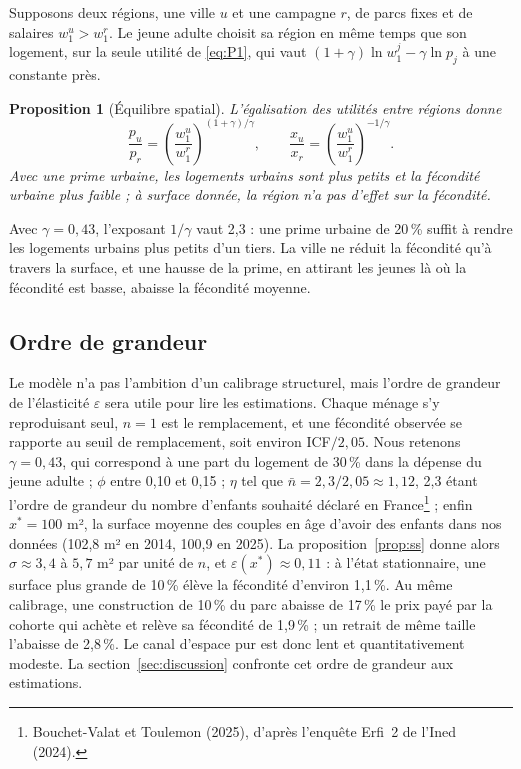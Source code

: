 \documentclass[11pt,a4paper]{article}
\theoremstyle{plain}
\newtheorem{proposition}{Proposition}
\theoremstyle{definition}
\theoremstyle{remark}
\newcommand{\eps}{\varepsilon}
\begin{document}
Supposons deux régions, une ville $u$ et une campagne $r$, de parcs fixes et de salaires $w_1^u > w_1^r$. Le jeune adulte choisit sa région en même temps que son logement, sur la seule utilité de \eqref{eq:P1}, qui vaut $(1+\gamma)\ln w_1^j - \gamma\ln p_j$ à une constante près.

\begin{proposition}[Équilibre spatial]\label{prop:regions}
L'égalisation des utilités entre régions donne
\[
\frac{p_u}{p_r} = \left(\frac{w_1^u}{w_1^r}\right)^{(1+\gamma)/\gamma}, \qquad
\frac{x_u}{x_r} = \left(\frac{w_1^u}{w_1^r}\right)^{-1/\gamma}.
\]
Avec une prime urbaine, les logements urbains sont plus petits et la fécondité urbaine plus faible ; à surface donnée, la région n'a pas d'effet sur la fécondité.
\end{proposition}

Avec $\gamma = 0{,}43$, l'exposant $1/\gamma$ vaut 2,3 : une prime urbaine de 20\,\% suffit à rendre les logements urbains plus petits d'un tiers. La ville ne réduit la fécondité qu'à travers la surface, et une hausse de la prime, en attirant les jeunes là où la fécondité est basse, abaisse la fécondité moyenne.

\subsection{Ordre de grandeur}\label{sec:calibrage}

Le modèle n'a pas l'ambition d'un calibrage structurel, mais l'ordre de grandeur de l'élasticité $\eps$ sera utile pour lire les estimations. Chaque ménage s'y reproduisant seul, $n = 1$ est le remplacement, et une fécondité observée se rapporte au seuil de remplacement, soit environ ICF$/2{,}05$. Nous retenons $\gamma = 0{,}43$, qui correspond à une part du logement de 30\,\% dans la dépense du jeune adulte ; $\phi$ entre 0,10 et 0,15 ; $\eta$ tel que $\bar n = 2{,}3/2{,}05 \approx 1{,}12$, 2,3 étant l'ordre de grandeur du nombre d'enfants souhaité déclaré en France\footnote{Bouchet-Valat et Toulemon (2025), d'après l'enquête Erfi~2 de l'Ined (2024).} ; enfin $x^* = 100$ m², la surface moyenne des couples en âge d'avoir des enfants dans nos données (102,8 m² en 2014, 100,9 en 2025). La proposition~\ref{prop:ss} donne alors $\sigma \approx 3{,}4$ à $5{,}7$ m² par unité de $n$, et $\eps(x^*) \approx 0{,}11$ : à l'état stationnaire, une surface plus grande de 10\,\% élève la fécondité d'environ 1,1\,\%. Au même calibrage, une construction de 10\,\% du parc abaisse de 17\,\% le prix payé par la cohorte qui achète et relève sa fécondité de 1,9\,\% ; un retrait de même taille l'abaisse de 2,8\,\%. Le canal d'espace pur est donc lent et quantitativement modeste. La section~\ref{sec:discussion} confronte cet ordre de grandeur aux estimations.
\end{document}
